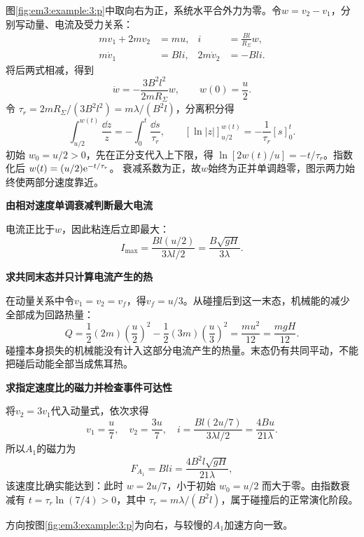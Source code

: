 \begin{solution}
图\ref{fig:em3:example:3:p}中取向右为正，系统水平合外力为零。令$w=v_2-v_1$，分别写动量、电流及受力关系：
\begin{align*}
 mv_1+2mv_2&=mu, & i&=\frac{Bl}{R_\Sigma}w,\\
 m\dot v_1&=Bli, & 2m\dot v_2&=-Bli.
\end{align*}
将后两式相减，得到
\[
 \dot w=-\frac{3B^2l^2}{2mR_\Sigma}w,\qquad
 w(0)=\frac u2.
\]
令 $\tau_r=2mR_\Sigma/(3B^2l^2)=m\lambda/(B^2l)$，分离积分得
\[
\int_{u/2}^{w(t)}\frac{\dd z}{z}=-\int_0^t\frac{\dd s}{\tau_r},
\qquad [\ln|z|]_{u/2}^{w(t)}=-\frac1{\tau_r}[s]_0^t.
\]
初始 $w_0=u/2>0$，先在正分支代入上下限，得
$\ln[2w(t)/u]=-t/\tau_r$。指数化后 $w(t)=(u/2)\mathrm e^{-t/\tau_r}$。
衰减系数为正，故$w$始终为正并单调趋零，图示两力始终使两部分速度靠近。



\par\medskip{}\noindent\textbf{由相对速度单调衰减判断最大电流}\par\nobreak
电流正比于$w$，因此粘连后立即最大：
\[
 \boxed{I_{\max}=\frac{Bl(u/2)}{3\lambda l/2}
                    =\frac{B\sqrt{gH}}{3\lambda}}.
\]



\par\medskip{}\noindent\textbf{求共同末态并只计算电流产生的热}\par\nobreak
在动量关系中令$v_1=v_2=v_f$，得$v_f=u/3$。从碰撞后到这一末态，机械能的减少全部成为回路热量：
\[
 \boxed{Q=\frac12(2m)\left(\frac u2\right)^2
           -\frac12(3m)\left(\frac u3\right)^2
          =\frac{mu^2}{12}=\frac{mgH}{12}}.
\]
碰撞本身损失的机械能没有计入这部分电流产生的热量。末态仍有共同平动，不能把碰后动能全部当成焦耳热。



\par\medskip{}\noindent\textbf{求指定速度比的磁力并检查事件可达性}\par\nobreak
将$v_2=3v_1$代入动量式，依次求得
\[
 v_1=\frac u7,\quad v_2=\frac{3u}7,\quad
 i=\frac{Bl(2u/7)}{3\lambda l/2}=\frac{4Bu}{21\lambda}.
\]
所以$A_1$的磁力为
\[
 \boxed{F_{A_1}=Bli=\frac{4B^2l\sqrt{gH}}{21\lambda}},
\]
该速度比确实能达到：此时 $w=2u/7$，小于初始 $w_0=u/2$ 而大于零。由指数衰减有 $t=\tau_r\ln(7/4)>0$，其中 $\tau_r=m\lambda/(B^2l)$，属于碰撞后的正常演化阶段。



方向按图\ref{fig:em3:example:3:p}为向右，与较慢的$A_1$加速方向一致。
\end{solution}
